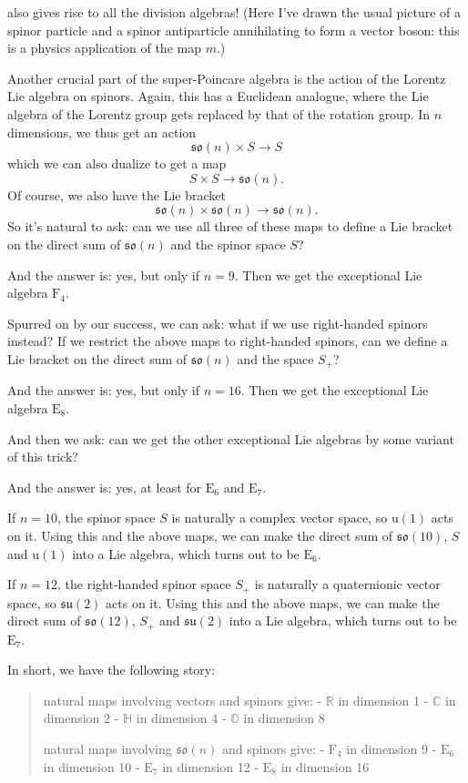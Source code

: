 \documentclass{article}
\begin{document}
also gives rise to all the division algebras! (Here I've drawn the usual
picture of a spinor particle and a spinor antiparticle annihilating to
form a vector boson: this is a physics application of the map \(m\).)

Another crucial part of the super-Poincare algebra is the action of the
Lorentz Lie algebra on spinors. Again, this has a Euclidean analogue,
where the Lie algebra of the Lorentz group gets replaced by that of the
rotation group. In \(n\) dimensions, we thus get an action
\[\mathfrak{so}(n) \times S \to S\] which we can also dualize to get a
map \[S \times S \to \mathfrak{so}(n).\] Of course, we also have the Lie
bracket
\[\mathfrak{so}(n) \times \mathfrak{so}(n) \to \mathfrak{so}(n).\] So
it's natural to ask: can we use all three of these maps to define a Lie
bracket on the direct sum of \(\mathfrak{so}(n)\) and the spinor space
\(S\)?

And the answer is: yes, but only if \(n = 9\). Then we get the
exceptional Lie algebra \(\mathrm{F}_4\).

Spurred on by our success, we can ask: what if we use right-handed
spinors instead? If we restrict the above maps to right-handed spinors,
can we define a Lie bracket on the direct sum of \(\mathfrak{so}(n)\)
and the space \(S_+\)?

And the answer is: yes, but only if \(n = 16\). Then we get the
exceptional Lie algebra \(\mathrm{E}_8\).

And then we ask: can we get the other exceptional Lie algebras by some
variant of this trick?

And the answer is: yes, at least for \(\mathrm{E}_6\) and
\(\mathrm{E}_7\).

If \(n = 10\), the spinor space \(S\) is naturally a complex vector
space, so \(\mathrm{u}(1)\) acts on it. Using this and the above maps,
we can make the direct sum of \(\mathfrak{so}(10)\), \(S\) and
\(\mathrm{u}(1)\) into a Lie algebra, which turns out to be
\(\mathrm{E}_6\).

If \(n = 12\), the right-handed spinor space \(S_+\) is naturally a
quaternionic vector space, so \(\mathfrak{su}(2)\) acts on it. Using
this and the above maps, we can make the direct sum of
\(\mathfrak{so}(12)\), \(S_+\) and \(\mathfrak{su}(2)\) into a Lie
algebra, which turns out to be \(\mathrm{E}_7\).

In short, we have the following story:

\begin{quote}
natural maps involving vectors and spinors give: - \(\mathbb{R}\) in
dimension 1 - \(\mathbb{C}\) in dimension 2 - \(\mathbb{H}\) in
dimension 4 - \(\mathbb{O}\) in dimension 8

natural maps involving \(\mathfrak{so}(n)\) and spinors give: -
\(\mathrm{F}_4\) in dimension 9 - \(\mathrm{E}_6\) in dimension 10 -
\(\mathrm{E}_7\) in dimension 12 - \(\mathrm{E}_8\) in dimension 16
\end{quote}
\end{document}
